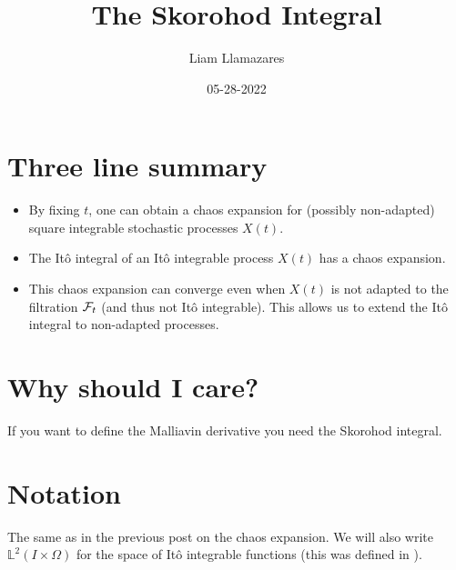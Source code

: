 \documentclass[12pt]{article}
\begin{document}
\title{The Skorohod Integral}
\author{Liam Llamazares}
\date{05-28-2022}
\maketitle
\section{ Three line summary}
\begin{itemize}
    \item By fixing $t$, one can obtain a chaos expansion for (possibly non-adapted) square integrable stochastic processes $X(t)$.
    \item The Itô integral of an Itô integrable process $X(t)$ has a chaos expansion.
    \item This chaos expansion can converge even when $X(t)$ is not adapted to the filtration $\mathcal{F}_t$ (and thus not Itô integrable). This allows us to extend the Itô integral to non-adapted processes.
\end{itemize}
\section{Why should I care?}
If you want to define the Malliavin derivative you need the Skorohod integral.
\section{Notation}
The same as in the previous post \cite{Chaosblog} on the chaos expansion. We will also write $\mathbb{L}^2(I\times \Omega)$ for the space of Itô integrable functions (this was defined in \cite{Itointblog}).
\end{document}
